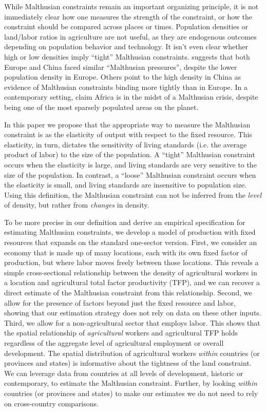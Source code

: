 \documentclass[11pt]{article}
\begin{document}
While Malthusian constraints remain an important organizing principle, it is not immediately clear how one measures the strength of the constraint, or how the constraint should be compared across places or times. Population densities or land/labor ratios in agriculture are not useful, as they are endogenous outcomes depending on population behavior and technology. It isn't even clear whether high or low densities imply ``tight'' Malthusian constraints. \citet{pom2000} suggests that both Europe and China faced similar ``Malthusian pressures'', despite the lower population density in Europe. Others \citep{Elvin1973,huang2002} point to the high density in China as evidence of Malthusian constraints binding more tightly than in Europe. In a contemporary setting, \citet{conleyetal2007} claim Africa is in the midst of a Malthusian crisis, despite being one of the most sparsely populated areas on the planet.

In this paper we propose that the appropriate way to measure the Malthusian constraint is as the elasticity of output with respect to the fixed resource. This elasticity, in turn, dictates the sensitivity of living standards (i.e. the average product of labor) to the size of the population. A ``tight'' Malthusian constraint occurs when the elasticity is large, and living standards are very sensitive to the size of the population. In contrast, a ``loose'' Malthusian constraint occurs when the elasticity is small, and living standards are insensitive to population size. Using this definition, the Malthusian constraint can not be inferred from the \textit{level} of density, but rather from \textit{changes} in density.

To be more precise in our definition and derive an empirical specification for estimating Malthusian constraints, we develop a model of production with fixed resources that expands on the standard one-sector version. First, we consider an economy that is made up of many locations, each with its own fixed factor of production, but where labor moves freely between those locations. This reveals a simple cross-sectional relationship between the density of agricultural workers in a location and agricultural total factor productivity (TFP), and we can recover a direct estimate of the Malthusian constraint from this relationship. Second, we allow for the presence of factors beyond just the fixed resource and labor, showing that our estimation strategy does not rely on data on these other inputs. Third, we allow for a non-agricultural sector that employs labor. This shows that the spatial relationship of \textit{agricultural} workers and agricultural TFP holds regardless of the aggregate level of agricultural employment or overall development. The spatial distribution of agricultural workers \textit{within} countries (or provinces and states) is informative about the tightness of the land constraint. We can leverage data from countries at all levels of development, historic or contemporary, to estimate the Malthusian constraint. Further, by looking \textit{within} countries (or provinces and states) to make our estimates we do not need to rely on cross-country comparisons.
\end{document}
